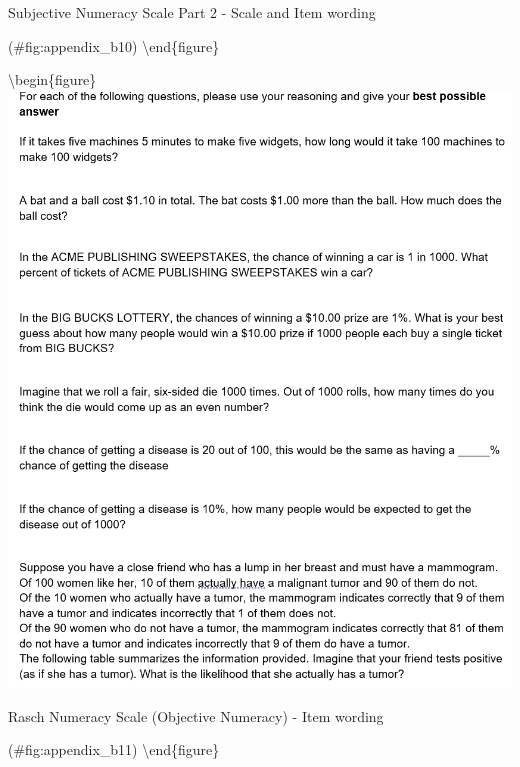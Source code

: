 \documentclass[
  english,
  man]{apa6}
\begin{document}
\caption{Subjective Numeracy Scale Part 2 - Scale and Item wording}

(\#fig:appendix\_b10)
\textbackslash end\{figure\}

\textbackslash begin\{figure\}
\includegraphics[width=1\linewidth]{appendix_b_11}

\caption{Rasch Numeracy Scale (Objective Numeracy) - Item wording}

(\#fig:appendix\_b11)
\textbackslash end\{figure\}
\end{document}
